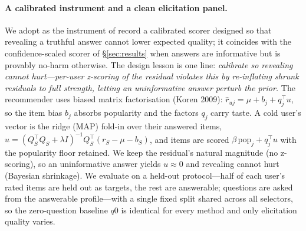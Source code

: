 \documentclass[11pt]{article}
\begin{document}
\paragraph{A calibrated instrument and a clean elicitation panel.} We adopt as the instrument of record a calibrated
scorer designed so that revealing a truthful answer cannot lower expected quality; it coincides with the confidence-scaled
scorer of \S\ref{sec:results} when answers are informative but is provably no-harm otherwise. The design lesson is one
line: \emph{calibrate so revealing cannot hurt---per-user z-scoring of the residual violates this by re-inflating shrunk
residuals to full strength, letting an uninformative answer perturb the prior.} The recommender uses biased matrix
factorisation (Koren 2009): $\hat r_{uj}=\mu+b_j+q_j^\top u$, so the item bias $b_j$ absorbs popularity and the factors
$q_j$ carry taste. A cold user's vector is the ridge (MAP) fold-in over their answered items, $u=(Q_S^\top Q_S+\lambda
I)^{-1}Q_S^\top(r_S-\mu-b_S)$, and items are scored $\beta\,\mathrm{pop}_j+q_j^\top u$ with the popularity floor retained.
We keep the residual's natural magnitude (no z-scoring), so an uninformative answer yields $u\!\approx\!0$ and revealing
cannot hurt (Bayesian shrinkage). We
evaluate on a held-out protocol---half of each user's rated items are held out as targets, the rest are answerable;
questions are asked from the answerable profile---with a single fixed split shared across all selectors, so the
zero-question baseline $q0$ is identical for every method and only elicitation quality varies.
\end{document}
